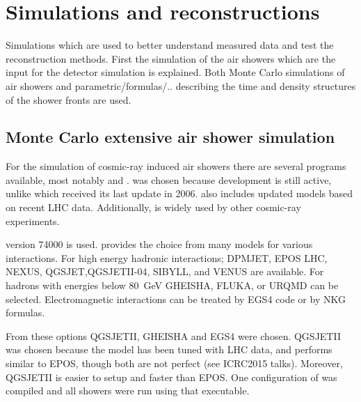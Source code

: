 \chapter{Simulations and reconstructions}
\label{ch:reconstructions}


Simulations which are used to better understand measured data and test the reconstruction methods. First the simulation of the air showers which are the input for the detector simulation is explained. Both Monte Carlo simulations of air showers and parametric/formulas/.. describing the time and density structures of the shower fronts are used.


\section{Monte Carlo extensive air shower simulation}

For the simulation of cosmic-ray induced air showers there are several programs available, most notably \corsika and \aires \cite{sciutto1999}. \corsika was chosen because development is still active, unlike \aires which received its last update in 2006. \corsika also includes updated models based on recent LHC data. Additionally, \corsika is widely used by other cosmic-ray experiments.

\corsika version 74000 is used. \corsika provides the choice from many models for various interactions. For high energy hadronic interactions; DPMJET, EPOS LHC\cite{pierog2013}, NEXUS, QGSJET,QGSJETII-04\cite{ostapchenko2013}, SIBYLL, and VENUS are available. For hadrons with energies below \SI{80}{\GeV} GHEISHA\cite{fesefeldt1985}, FLUKA, or URQMD can be selected. Electromagnetic interactions can be treated by EGS4\cite{egs4} code or by NKG formulas.

From these options QGSJETII, GHEISHA and EGS4 were chosen. QGSJETII was chosen because the model has been tuned with LHC data, and performs similar to EPOS, though both are not perfect (see ICRC2015 talks). Moreover, QGSJETII is easier to setup and faster than EPOS. One configuration of \corsika was compiled and all showers were run using that executable.



